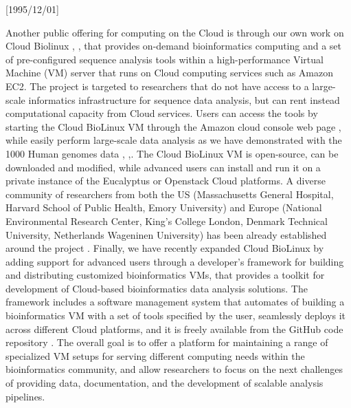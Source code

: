 \NeedsTeXFormat{LaTeX2e}[1995/12/01] \documentclass[10pt]{bmc_article}
\newenvironment{bmcformat}{\begin{raggedright}\baselineskip20pt\sloppy\setboolean{publ}{false}}{\end{raggedright}\baselineskip20pt\sloppy}
\begin{document}
\begin{bmcformat}
Another public offering for computing on the Cloud is through our own work on Cloud Biolinux \cite{Krampis2012},
\cite{cloudbio}, that provides on-demand bioinformatics computing and a set of pre-configured sequence analysis 
tools within a high-performance Virtual Machine (VM) server that runs on Cloud computing services such as Amazon 
EC2. The project is targeted to researchers that do not have access to a large-scale informatics infrastructure 
for sequence data analysis, but can rent instead computational capacity from Cloud services. Users can access 
the tools by starting the Cloud BioLinux VM through the Amazon cloud console web page \cite{console}, while 
easily perform large-scale data analysis as we have demonstrated with the 1000 Human genomes data \cite{1000tube1},
\cite{1000tube2},\cite{Clarke2012}. The Cloud BioLinux VM is open-source, can be downloaded and modified, while 
advanced users can install and run it on a private instance of the Eucalyptus \cite{euca} or Openstack 
\cite{openstack} Cloud platforms. A diverse community of researchers from both the US
(Massachusetts General Hospital, Harvard School of Public Health, Emory University) and Europe (National
Environmental Research Center, King's College London, Denmark Technical University, Netherlands Wageninen
University) has been already established around the project \cite{googlegroup}. Finally, we have recently 
expanded Cloud BioLinux by adding support for advanced users through a developer's framework for building 
and distributing customized bioinformatics VMs, that provides a toolkit for development of Cloud-based 
bioinformatics data analysis solutions. The framework includes a software management system that automates 
of building a bioinformatics VM with a set of tools specified by the user, seamlessly deploys it across different
Cloud platforms, and it is freely available from the GitHub code repository \cite{fabric}.  The overall goal is
to offer a platform for maintaining a range of specialized VM setups for serving different computing needs
within the bioinformatics community, and allow researchers to focus on the next challenges of providing data,
documentation, and the development of scalable analysis pipelines. 


\end{bmcformat}
\end{document}
